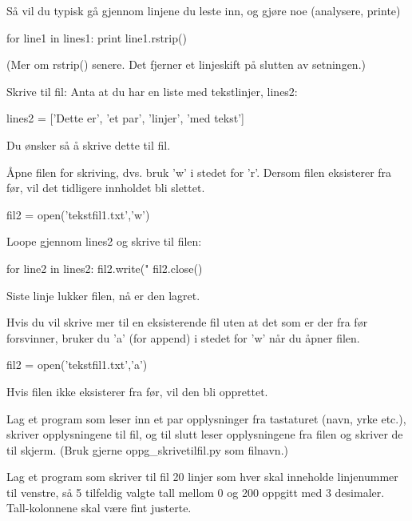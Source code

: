{Så vil du typisk gå gjennom linjene du leste inn, og gjøre noe (analysere, printe)
\begin{usncodebox}
for line1 in lines1:
    print line1.rstrip()
\end{usncodebox}

(Mer om rstrip() senere. Det fjerner et linjeskift på slutten av setningen.)

Skrive til fil: 
Anta at du har en liste med tekstlinjer, lines2:

\begin{usncodebox}
lines2 = ['Dette er', 'et par', 'linjer', 'med tekst']
\end{usncodebox}

Du ønsker så å skrive dette til fil.

Åpne filen for skriving, dvs. bruk 'w' i stedet for 'r'. Dersom filen eksisterer fra før, vil det tidligere innholdet bli slettet.

\begin{usncodebox}
fil2 = open('tekstfil1.txt','w')    
\end{usncodebox}

Loope gjennom lines2 og skrive til filen:
\begin{usncodebox}
for line2 in lines2:
    fil2.write("%
fil2.close()
\end{usncodebox}

Siste linje lukker filen, nå er den lagret. 

Hvis du vil skrive mer til en eksisterende fil uten at det som er der fra før forsvinner, bruker du 'a' (for append) i stedet for 'w' når du åpner filen.

\begin{usncodebox}
fil2 = open('tekstfil1.txt','a')
\end{usncodebox}

Hvis filen ikke eksisterer fra før, vil den bli opprettet. 
 
\begin{question}
Lag et program som leser inn et par opplysninger fra tastaturet (navn, yrke etc.), skriver opplysningene til fil, og til slutt leser 
opplysningene fra filen og skriver de til skjerm. (Bruk gjerne oppg\_{}skrivetilfil.py som filnavn.)
\end{question}

\begin{question}
Lag et program som skriver til fil 20 linjer som hver skal inneholde linjenummer til venstre, så 5 tilfeldig valgte tall mellom 0 og 200 oppgitt med 3 desimaler. Tall-kolonnene skal være fint justerte.
\end{question}

}
